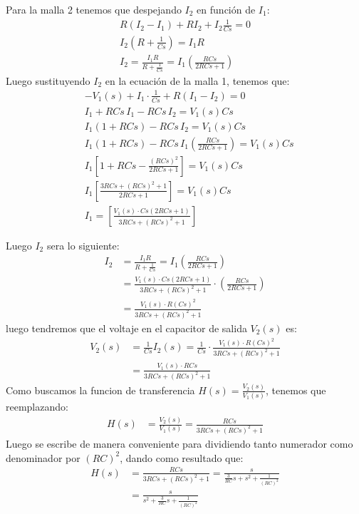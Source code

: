 \documentclass[
  11pt,
  letterpaper,
   addpoints,
   answers
  ]{exam}
\begin{document}
\begin{questions}
\begin{solution}
\begin{itemize}
Para la malla 2 tenemos que despejando \( I_2 \) en función de \( I_1 \):
\begin{align}
  R(I_2 - I_1) + R I_2 + I_2 \frac{1}{Cs} = 0 \\
    I_2(R + \frac{1}{Cs}) = I_1 R \\
    I_2 = \frac{I_1 R}{R + \frac{1}{Cs}} = I_1 \left( \frac{RCs}{2RCs + 1} \right)
\end{align}
Luego sustituyendo \( I_2 \) en la ecuación de la malla 1, tenemos que:
\begin{align*}
    &-V_1(s) + I_1 \cdot \frac{1}{Cs} + R(I_1 - I_2) = 0 \\
    &I_1 + RCs \, I_1 - RCs \, I_2 = V_1(s) Cs \\
    &I_1 (1 + RCs) - RCs\, I_2 = V_1(s) Cs \\
    &I_1 (1 + RCs) - RCs \, I_1 \left( \frac{RCs}{2RCs + 1} \right) = V_1(s) Cs \\
    &I_1 \left[ 1 + RCs - \frac{(RCs)^2}{2RCs + 1} \right] = V_1(s) Cs \\
    &I_1 \left[ \frac{3RCs + (RCs)^2 + 1}{2RCs + 1} \right] = V_1(s) Cs \\
    &I_1 = \left[ \frac{V_1(s) \cdot Cs (2RCs + 1)}{3RCs + (RCs)^2 + 1} \right]
\end{align*}


Luego \( I_{2} \) sera lo siguiente:
\begin{align}
    I_2 &= \frac{I_1 R}{R + \frac{1}{Cs}} = I_1 \left( \frac{RCs}{2RCs + 1} \right)\\
    &= \frac{V_1(s) \cdot Cs (2RCs + 1)}{3RCs + (RCs)^2 + 1} \cdot \left( \frac{RCs}{2RCs + 1} \right)\\
    &= \frac{V_1(s) \cdot R (Cs)^2}{3RCs + (RCs)^2 + 1}
\end{align}
luego tendremos que el voltaje en el capacitor de salida \( V_2(s) \) es:
\begin{align}
    V_2(s) &= \frac{1}{Cs} I_2(s) = \frac{1}{Cs} \cdot \frac{V_1(s) \cdot R (Cs)^2}{3RCs + (RCs)^2 + 1}\\
    &= \frac{V_1(s) \cdot R Cs}{3RCs + (RCs)^2 + 1}
\end{align}
Como buscamos la funcion de transferencia \( H(s) = \frac{V_2(s)}{V_1(s)} \), tenemos que reemplazando:
\begin{align}
    H(s) &= \frac{V_2(s)}{V_1(s)} = \frac{R Cs}{3RCs + (RCs)^2 + 1}
\end{align}
Luego se escribe de manera conveniente para dividiendo tanto numerador como denominador por \( (RC)^{2} \), dando como resultado que:
\begin{align}
    H(s) &= \frac{R Cs}{3RCs + (RCs)^2 + 1} = \frac{s}{\frac{3}{RC}s + s^2 + \frac{1}{(RC)^2}}\\
    &= \frac{s}{s^2 + \frac{3}{RC}s + \frac{1}{(RC)^2}}
\end{align}


\end{itemize}
\end{solution}
\end{questions}
\end{document}
